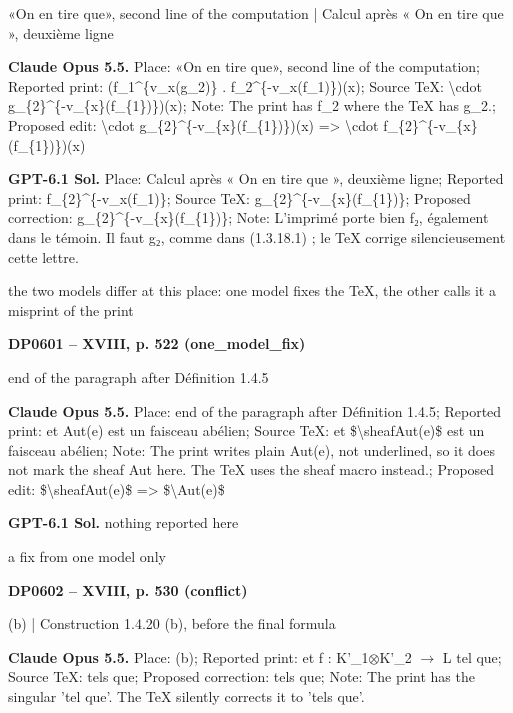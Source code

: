 «On en tire que», second line of the computation | Calcul après « On en tire que », deuxième ligne\par
\textbf{Claude Opus 5.5.} Place: «On en tire que», second line of the computation; Reported print: (f\_1\textasciicircum{}\{v\_x(g\_2)\} . f\_2\textasciicircum{}\{-v\_x(f\_1)\})(x); Source TeX: \textbackslash{}cdot g\_\{2\}\textasciicircum{}\{-v\_\{x\}(f\_\{1\})\})(x); Note: The print has f\_2 where the TeX has g\_2.; Proposed edit: \textbackslash{}cdot g\_\{2\}\textasciicircum{}\{-v\_\{x\}(f\_\{1\})\})(x) =\allowbreak > \textbackslash{}cdot f\_\{2\}\textasciicircum{}\{-v\_\{x\}(f\_\{1\})\})(x)\par
\textbf{GPT-6.1 Sol.} Place: Calcul après « On en tire que », deuxième ligne; Reported print: f\_\{2\}\textasciicircum{}\{-v\_x(f\_1)\}; Source TeX: g\_\{2\}\textasciicircum{}\{-v\_\{x\}(f\_\{1\})\}; Proposed correction: g\_\{2\}\textasciicircum{}\{-v\_\{x\}(f\_\{1\})\}; Note: L'imprimé porte bien f₂, également dans le témoin. Il faut g₂, comme dans (1.3.18.1) ; le TeX corrige silencieusement cette lettre.\par
the two models differ at this place: one model fixes the TeX, the other calls it a misprint of the print\par
\par\noindent\hypertarget{DP0601}{}\textbf{DP0601 -- XVIII, p. 522 (one\_model\_fix)}\par
end of the paragraph after Définition 1.4.5\par
\textbf{Claude Opus 5.5.} Place: end of the paragraph after Définition 1.4.5; Reported print: et Aut(e) est un faisceau abélien; Source TeX: et \$\textbackslash{}sheafAut(e)\$ est un faisceau abélien; Note: The print writes plain Aut(e), not underlined, so it does not mark the sheaf Aut here. The TeX uses the sheaf macro instead.; Proposed edit: \$\textbackslash{}sheafAut(e)\$ =\allowbreak > \$\textbackslash{}Aut(e)\$\par
\textbf{GPT-6.1 Sol.} nothing reported here\par
a fix from one model only\par
\par\noindent\hypertarget{DP0602}{}\textbf{DP0602 -- XVIII, p. 530 (conflict)}\par
(b) | Construction 1.4.20 (b), before the final formula\par
\textbf{Claude Opus 5.5.} Place: (b); Reported print: et f : K'\_1\ensuremath{\otimes}K'\_2 \ensuremath{\to} L tel que; Source TeX: tels que; Proposed correction: tels que; Note: The print has the singular 'tel que'. The TeX silently corrects it to 'tels que'.\par
